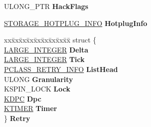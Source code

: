 \begin{DoxyCompactItemize}
\begin{tabbing}
\end{tabbing}\item 
\mbox{\label{struct___c_l_a_s_s___p_r_i_v_a_t_e___f_d_o___d_a_t_a_a6fcb41309b4ea3bd99ecfbad118aa52d}} 
U\+L\+O\+N\+G\+\_\+\+P\+TR {\bfseries Hack\+Flags}
\item 
\mbox{\label{struct___c_l_a_s_s___p_r_i_v_a_t_e___f_d_o___d_a_t_a_a5136c30b97d9258ca8101fd496ecb896}} 
\hyperlink{struct___s_t_o_r_a_g_e___h_o_t_p_l_u_g___i_n_f_o}{S\+T\+O\+R\+A\+G\+E\+\_\+\+H\+O\+T\+P\+L\+U\+G\+\_\+\+I\+N\+FO} {\bfseries Hotplug\+Info}
\item 
\mbox{\label{struct___c_l_a_s_s___p_r_i_v_a_t_e___f_d_o___d_a_t_a_a5451ea2838351c0ca72d2dffedd7fddf}} 
\begin{tabbing}
xx\=xx\=xx\=xx\=xx\=xx\=xx\=xx\=xx\=\kill
struct \{\\
\>\hyperlink{union___l_a_r_g_e___i_n_t_e_g_e_r}{LARGE\_INTEGER} {\bfseries Delta}\\
\>\hyperlink{union___l_a_r_g_e___i_n_t_e_g_e_r}{LARGE\_INTEGER} {\bfseries Tick}\\
\>\hyperlink{struct___c_l_a_s_s___r_e_t_r_y___i_n_f_o}{PCLASS\_RETRY\_INFO} {\bfseries ListHead}\\
\>ULONG {\bfseries Granularity}\\
\>KSPIN\_LOCK {\bfseries Lock}\\
\>\hyperlink{struct___k_d_p_c}{KDPC} {\bfseries Dpc}\\
\>\hyperlink{struct___k_t_i_m_e_r}{KTIMER} {\bfseries Timer}\\
\} {\bfseries Retry}\\


\end{tabbing}
\end{DoxyCompactItemize}
